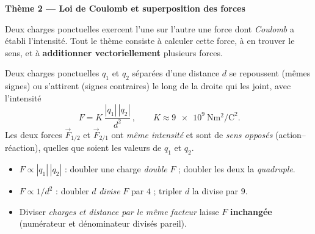 \documentclass[11pt,a4paper]{article}
\newcommand{\vv}[1]{\vec{#1}}\newcommand{\ds}{\displaystyle}
\begin{document}

\begin{center}\large\bfseries\color{primarydark}
Thème 2 — Loi de Coulomb et superposition des forces
\end{center}

Deux charges ponctuelles exercent l'une sur l'autre une force dont \emph{Coulomb} a établi
l'intensité. Tout le thème consiste à calculer cette force, à en trouver le sens, et à
\textbf{additionner vectoriellement} plusieurs forces.

\begin{cle}
Deux charges ponctuelles $q_1$ et $q_2$ séparées d'une distance $d$ se repoussent (mêmes signes) ou
s'attirent (signes contraires) le long de la droite qui les joint, avec l'intensité
\[ \boxed{\,F = K\,\dfrac{|q_1|\,|q_2|}{d^{2}}\,},\qquad K \approx \num{9e9}\ \si{\newton\metre\squared\per\coulomb\squared}. \]
Les deux forces $\vv{F}_{1/2}$ et $\vv{F}_{2/1}$ ont \emph{même intensité} et sont de \emph{sens
opposés} (action--réaction), quelles que soient les valeurs de $q_1$ et $q_2$.
\end{cle}

\begin{center}
\end{center}

\begin{cle}
\begin{itemize}[leftmargin=1.5em,topsep=1pt,itemsep=1pt]
  \item $F \propto |q_1|\,|q_2|$ : doubler une charge \emph{double} $F$ ; doubler les deux la
        \emph{quadruple}.
  \item $F \propto 1/d^2$ : doubler $d$ \emph{divise} $F$ par $4$ ; tripler $d$ la divise par $9$.
  \item Diviser \emph{charges et distance par le même facteur} laisse $F$ \textbf{inchangée}
        (numérateur et dénominateur divisés pareil).
\end{itemize}
\end{cle}
\end{document}
